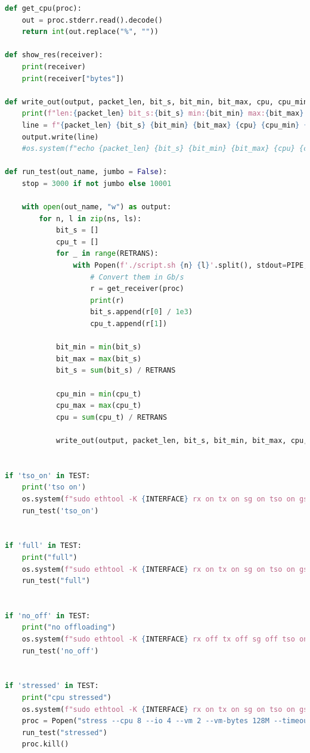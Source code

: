 \documentclass{exam}
\begin{document}
\begin{lstlisting}[language=python]
def get_cpu(proc):
    out = proc.stderr.read().decode()
    return int(out.replace("%", ""))

def show_res(receiver):
    print(receiver)
    print(receiver["bytes"])

def write_out(output, packet_len, bit_s, bit_min, bit_max, cpu, cpu_min, cpu_max, out_name):
    print(f"len:{packet_len} bit_s:{bit_s} min:{bit_min} max:{bit_max} cpu:{cpu} cpu_min:{cpu_min} cpu_max:{cpu_max}")
    line = f"{packet_len} {bit_s} {bit_min} {bit_max} {cpu} {cpu_min} {cpu_max}\n"
    output.write(line)
    #os.system(f"echo {packet_len} {bit_s} {bit_min} {bit_max} {cpu} {cpu_min} {cpu_max}>> {out_name}")

def run_test(out_name, jumbo = False):
    stop = 3000 if not jumbo else 10001

    with open(out_name, "w") as output:
        for n, l in zip(ns, ls):
            bit_s = []
            cpu_t = []
            for _ in range(RETRANS):
                with Popen(f'./script.sh {n} {l}'.split(), stdout=PIPE, stderr=PIPE) as proc:
                    # Convert them in Gb/s
                    r = get_receiver(proc)
                    print(r)
                    bit_s.append(r[0] / 1e3)
                    cpu_t.append(r[1])

            bit_min = min(bit_s)
            bit_max = max(bit_s)
            bit_s = sum(bit_s) / RETRANS

            cpu_min = min(cpu_t)
            cpu_max = max(cpu_t)
            cpu = sum(cpu_t) / RETRANS

            write_out(output, packet_len, bit_s, bit_min, bit_max, cpu, cpu_min, cpu_max, out_name)


if 'tso_on' in TEST:
    print('tso on')
    os.system(f"sudo ethtool -K {INTERFACE} rx on tx on sg on tso on gso off gro off")
    run_test('tso_on')


if 'full' in TEST:
    print("full")
    os.system(f"sudo ethtool -K {INTERFACE} rx on tx on sg on tso on gso on gro on")
    run_test("full")


if 'no_off' in TEST:
    print("no offloading")
    os.system(f"sudo ethtool -K {INTERFACE} rx off tx off sg off tso on gso off gro off")
    run_test('no_off')
        

if 'stressed' in TEST:
    print("cpu stressed")
    os.system(f"sudo ethtool -K {INTERFACE} rx on tx on sg on tso on gso on gro on")
    proc = Popen("stress --cpu 8 --io 4 --vm 2 --vm-bytes 128M --timeout 1000s".split())
    run_test("stressed")
    proc.kill()


\end{lstlisting}
\end{document}
